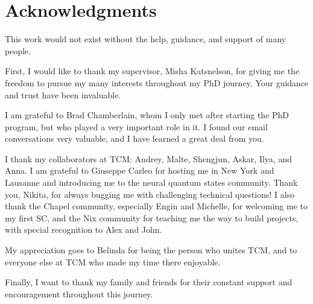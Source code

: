 \openleft\chapter{Acknowledgments}
This work would not exist without the help, guidance, and support of many people.

First, I would like to thank my supervisor, Misha Katsnelson, for giving me the freedom to pursue my many interests throughout my PhD journey. Your guidance and trust have been invaluable.

I am grateful to Brad Chamberlain, whom I only met after starting the PhD program, but who played a very important role in it. I found our email conversations very valuable, and I have learned a great deal from you.

I thank my collaborators at TCM: Andrey, Malte, Shengjun, Askar, Ilya, and Anna. I am grateful to Giuseppe Carleo for hosting me in New York and Lausanne and introducing me to the neural quantum states community. Thank you, Nikita, for always bugging me with challenging technical questions! I also thank the Chapel community, especially Engin and Michelle, for welcoming me to my first SC, and the Nix community for teaching me the way to build projects, with special recognition to Alex and John.

My appreciation goes to Belinda for being the person who unites TCM, and to everyone else at TCM who made my time there enjoyable.

Finally, I want to thank my family and friends for their constant support and encouragement throughout this journey.

